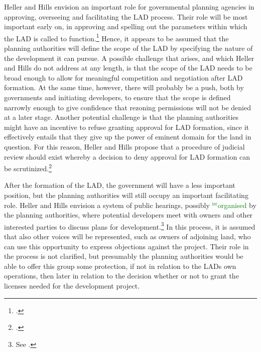 \documentclass[12pt,a4paper]{book} %
\newcommand{\isr}[1]{\textcolor{green}{$^{\textrm{isr}}${#1}}}
\begin{document}
Heller and Hills envision an important role for governmental planning agencies in approving, overseeing and facilitating the LAD process. Their role will be most important early on, in approving and spelling out the parameters within which the LAD is called to function.\footcite[1489-1491]{heller08} Hence, it appears to be assumed that the planning authorities will define the scope of the LAD by specifying the nature of the development it can pursue. A possible challenge that arises, and which Heller and Hills do not address at any length, is that the scope of the LAD needs to be broad enough to allow for meaningful competition and negotiation after LAD formation. At the same time, however, there will probably be a push, both by governments and initiating developers, to ensure that the scope is defined narrowly enough to give confidence that rezoning permissions will not be denied at a later stage. Another potential challenge is that the planning authorities might have an incentive to refuse granting approval for LAD formation, since it effectively entails that they give up the power of eminent domain for the land in question. For this reason, Heller and Hills propose that a procedure of judicial review should exist whereby a decision to deny approval for LAD formation can be scrutinized.\footcite[1490]{heller08} 

After the formation of the LAD, the government will have a less important position, but the planning authorities will still occupy an important facilitating role. Heller and Hills envision a system of public hearings, possibly \isr{organised} by the planning authorities, where potential developers meet with owners and other interested parties to discuss  plans for development.\footnote{See \cite[1490-1491]{heller08}.} In this process, it is assumed that also other voices will be represented, such as owners of adjoining land, who can use this opportunity to express objections against the project. Their role in the process is not clarified, but presumably the planning authorities would be able to offer this group some protection, if not in relation to the LADs own operations, then later in relation to the decision whether or not to grant the licenses needed for the development project.
\end{document}
